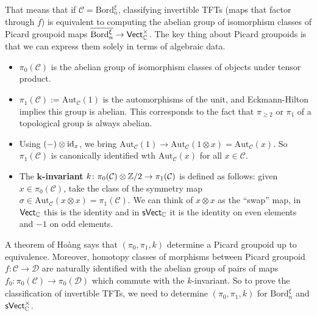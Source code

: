 That means that if $\mathcal{C} =\mathrm{Bord}_n ^{\xi}$, classifying invertible TFTs (maps that factor through $\overline{f}$) is equivalent to computing the abelian group of isomorphism classes of Picard groupoid maps $\overline{\mathrm{Bord}_n ^{\xi}}\to  \mathsf{Vect} _{\mathbb{C}}^{\times }$.
The key thing about Picard groupoids is that we can express them solely in terms of algebraic data.
\begin{itemize}
\setlength\itemsep{-.2em}
    \item $\pi_0(\mathcal{C} )$ is the abelian group of isomorphism classes of objects under tensor product.
    \item $\pi_1(\mathcal{C} ):=\mathrm{Aut}_{\mathcal{C} }(1)$ is the automorphisms of the unit, and Eckmann-Hilton implies this group is abelian. This corresponds to the fact that $\pi_{\geq 2}$ or $\pi_1$ of a topological group is always abelian.
    \item Using $(-) \otimes \operatorname{id}_x$, we bring $\mathrm{Aut}_{\mathcal{C} }(1) \to \mathrm{Aut}_{\mathcal{C} }(1 \otimes x)=\mathrm{Aut}_{\mathcal{C} }(x)$. So $\pi_1(\mathcal{C} )$ is canonically identified wth $\mathrm{Aut}_{\mathcal{C} }(x)$ for all $x \in \mathcal{C} $.
    \item The $\mathbf k$\textbf{-invariant} $k \colon \pi_0(\mathcal{C} ) \otimes \mathbb{Z} /2 \to \pi_1(\mathcal{C} )$ is defined as follows: given $x \in \pi_0(\mathcal{C} )$, take the class of the symmetry map $\sigma \in  \mathrm{Aut}_{\mathcal{C} }(x\otimes x)=\pi_1(\mathcal{C} )$. We can think of $x\otimes x$ as the ``swap'' map, in $\mathsf{Vect} _{\mathbb{C}}$ this is the identity and in $\mathsf{sVect} _{\mathbb{C}}$ it is the identity on even elements and $-1$ on odd elements.
\end{itemize}
A theorem of Ho\`ang says that $(\pi_0,\pi_1,k)$ determine a Picard groupoid up to equivalence. Moreover, homotopy classes of morphisms between Picard groupoid $f \colon \mathcal{C}  \to \mathcal{D}  $ are naturally identified with the abelian group of pairs of maps $f_0\colon \pi_0(\mathcal{C} ) \to \pi_0(\mathcal{D} )$ which commute with the $k$-invariant. So to prove the classification of invertible TFTs, we need to determine $(\pi_0,\pi_1,k)$ for $\overline{\mathrm{Bord}_n ^{\xi}}$ and $\mathsf{sVect} _{\mathbb{C}}^{\times }$.

